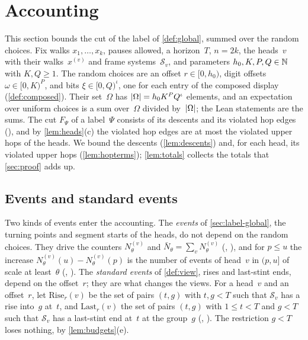 \section{Accounting}\label{sec:accounting}

This section bounds the cut of the label of \cref{def:global}, summed over the random choices. Fix walks $x_1,\dots,x_k$, pauses
allowed, a horizon~$T$, $n=2k$, the heads~$v$ with their walks~$x^{(v)}$ and frame systems~$\mathcal S_v$, and parameters
$h_0,K,P,Q\in\mathbb{N}$ with $K,Q\ge1$. The random choices are an offset $r\in[0,h_0)$, digit offsets $\omega\in[0,K)^P$, and bits
$\xi\in[0,Q)^\iota$, one for each entry of the composed display (\cref{def:composed}). Their set~$\Omega$ has
$\lvert \Omega \rvert=h_0K^PQ^\iota$ elements, and an expectation over uniform choices is a sum over~$\Omega$ divided by~$\lvert \Omega \rvert$; the
Lean statements are the sums. The cut $F_\Psi$ of a label~$\Psi$ consists of its descents and its violated hop edges
(), and by \cref{lem:heads}(c) the violated hop edges are at most the violated upper hops of the heads. We bound
the descents (\cref{lem:descents}) and, for each head, its violated upper hops (\cref{lem:hopterms}); \cref{lem:totals} collects
the totals that \cref{sec:proof} adds up.

\subsection{Events and standard events}\label{sec:acc-events}

Two kinds of events enter the accounting. The \emph{events} of \cref{sec:label-global}, the turning points and segment starts of
the heads, do not depend on the random choices. They drive the counters $N^{(v)}_\theta$ and $\bar N_\theta=\sum_vN^{(v)}_\theta$
(, ), and for $p\le u$ the increase $N^{(v)}_\theta(u)-N^{(v)}_\theta(p)$ is the number of events
of head~$v$ in $(p,u]$ of scale at least~$\theta$ (, ). The \emph{standard events} of
\cref{def:view}, rises and last-stint ends, depend on the offset~$r$; they are what changes the views. For a head~$v$ and an
offset~$r$, let $\mathrm{Rise}_r(v)$ be the set of pairs $(t,g)$ with $t,g<T$ such that $\mathcal S_v$ has a rise into~$g$ at~$t$,
and $\mathrm{Last}_r(v)$ the set of pairs $(t,g)$ with $1\le t<T$ and $g<T$ such that $\mathcal S_v$ has a last-stint end at~$t$
at the group~$g$ (, ). The restriction $g<T$ loses nothing, by
\cref{lem:budgets}(e).

